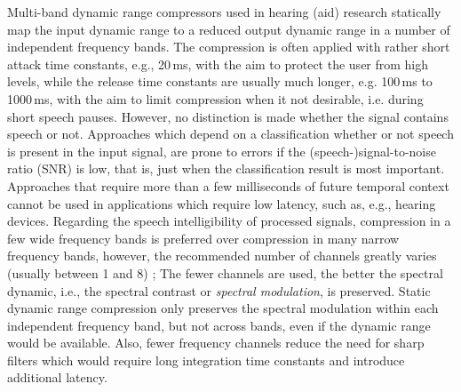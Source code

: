 \documentclass[10pt,a4paper,twocolumn]{article}
\begin{document}
Multi-band dynamic range compressors used in hearing (aid) research \cite[e.g. ][]{grimm2015} statically map the input dynamic range to a reduced output dynamic range in a number of independent frequency bands.
%
The compression is often applied with rather short attack time constants, e.g., 20\,ms, with the aim to protect the user from high levels, while the release time constants are usually much longer, e.g. 100\,ms to 1000\,ms, with the aim to limit compression when it not desirable, i.e. during short speech pauses.
%
However, no distinction is made whether the signal contains speech or not.
%
Approaches which depend on a classification whether or not speech is present in the input signal, are prone to errors if the (speech-)signal-to-noise ratio (SNR) is low, that is, just when the classification result is most important.
%
Approaches that require more than a few milliseconds of future temporal context cannot be used in applications which require low latency, such as, e.g., hearing devices.
%
Regarding the speech intelligibility of processed signals, compression in a few wide frequency bands is preferred over compression in many narrow frequency bands, however, the recommended number of channels greatly varies (usually between 1 and 8) \citep{plomp1988,dreschler1992,hohmann1995,yund1995,moore1999,souza2002};
The fewer channels are used, the better the spectral dynamic, i.e., the spectral contrast or \emph{spectral modulation}, is preserved.
%
Static dynamic range compression only preserves the spectral modulation within each independent frequency band, but not across bands, even if the dynamic range would be available.
%
Also, fewer frequency channels reduce the need for sharp filters which would require long integration time constants and introduce additional latency.
\end{document}
